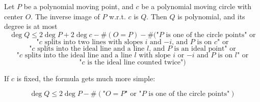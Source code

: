 \documentclass[a4paper]{article}
\begin{document}
\begin{theorem}
    Let $P$ be a polynomial moving point, and $c$ be a polynomial moving circle with center $O$. The inverse image of $P$ w.r.t. $c$ is $Q$. Then $Q$ is polynomial, and its degree is at most
    $$\deg Q\le2\deg P+2\deg c-\#(O=P)-\#(\text{"$P$ is one of the circle points" or}$$
    $$\text{"$c$ splits into two lines with slopes $i$ and $-i$, and $P$ is on $c$" or}$$
    $$\text{"$c$ splits into the ideal line and a line $l$, and $P$ is an ideal point" or}$$
    $$\text{"$c$ splits into the ideal line and a line $l$ with slope $i$ or $-i$ and $P$ is on $l$" or}$$
    $$\text{"$c$ is the ideal line counted twice"})$$
\end{theorem}

\begin{remark}
    If $c$ is fixed, the formula gets much more simple:

    $$\deg Q\le2\deg P-\#(\text{"$O=P$" or "$P$ is one of the circle points"})$$
\end{remark}
\end{document}
